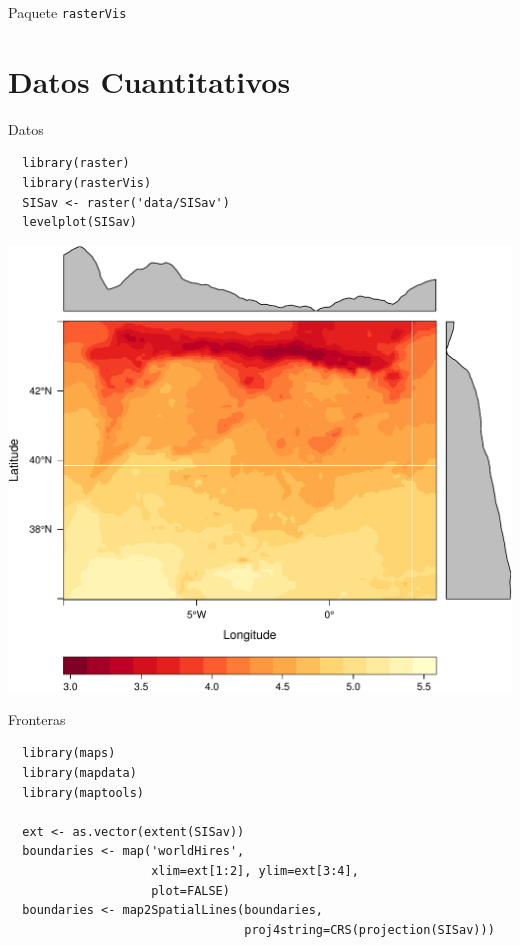 \documentclass[xcolor={usenames,svgnames,dvipsnames}]{beamer}
\begin{document}
\begin{frame}[fragile,label=sec-1-8]{Paquete \texttt{rasterVis}}
\end{frame}

\section{Datos Cuantitativos}
\label{sec-2}

\begin{frame}[fragile,label=sec-2-1]{Datos}
 \lstset{language=R,label= ,caption= ,numbers=none}
\begin{lstlisting}
  library(raster)
  library(rasterVis)
  SISav <- raster('data/SISav')
  levelplot(SISav)
\end{lstlisting}
\end{frame}

\begin{frame}[label=sec-2-2]{}
\includegraphics[width=.9\linewidth]{figs/leveplotSISavOrig.pdf}
\end{frame}

\begin{frame}[fragile,label=sec-2-3]{Fronteras}
 \lstset{language=R,label= ,caption= ,numbers=none}
\begin{lstlisting}
  library(maps)
  library(mapdata)
  library(maptools)
  
  ext <- as.vector(extent(SISav))
  boundaries <- map('worldHires',
                    xlim=ext[1:2], ylim=ext[3:4],
                    plot=FALSE)
  boundaries <- map2SpatialLines(boundaries,
                                 proj4string=CRS(projection(SISav)))
\end{lstlisting}
\end{frame}
\end{document}
